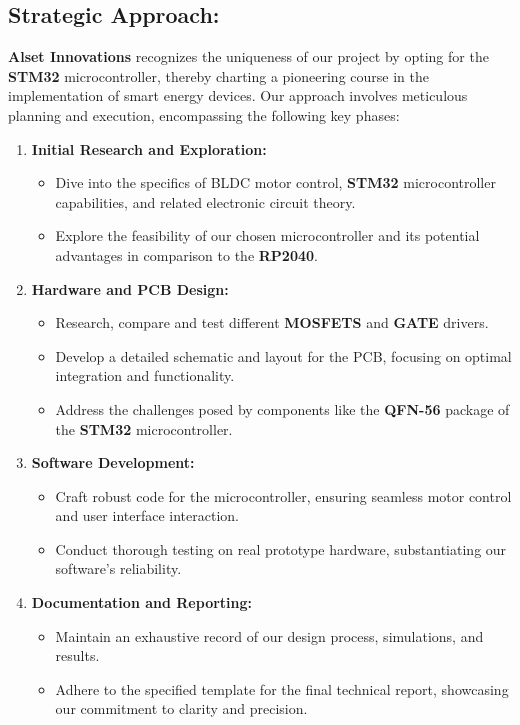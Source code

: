\subsection{Strategic Approach:}
\textbf{Alset Innovations} recognizes the uniqueness of our project by opting for the \textbf{STM32} microcontroller, thereby charting a pioneering course in the implementation of smart energy devices. Our approach involves meticulous planning and execution, encompassing the following key phases:

\begin{enumerate}
    \item \textbf{Initial Research and Exploration:}
        \begin{itemize}
            \item Dive into the specifics of BLDC motor control, \textbf{STM32} microcontroller capabilities, and related electronic circuit theory.
            \item Explore the feasibility of our chosen microcontroller and its potential advantages in comparison to the \textbf{RP2040}.
        \end{itemize}

    \item \textbf{Hardware and PCB Design:}
        \begin{itemize}
            \item Research, compare and test different \textbf{MOSFETS} and \textbf{GATE} drivers.
            \item Develop a detailed schematic and layout for the PCB, focusing on optimal integration and functionality.
            \item Address the challenges posed by components like the \textbf{QFN-56} package of the \textbf{STM32} microcontroller.
        \end{itemize}

    \item \textbf{Software Development:}
        \begin{itemize}
            \item Craft robust code for the microcontroller, ensuring seamless motor control and user interface interaction.
            \item Conduct thorough testing on real prototype hardware, substantiating our software's reliability.
        \end{itemize}

    \item \textbf{Documentation and Reporting:}
        \begin{itemize}
            \item Maintain an exhaustive record of our design process, simulations, and results.
            \item Adhere to the specified template for the final technical report, showcasing our commitment to clarity and precision.
        \end{itemize}
\end{enumerate}

